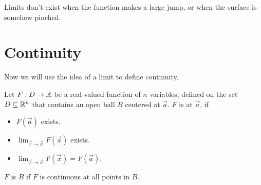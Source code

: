 \documentclass{ximera}
\begin{document}
 Limits don't exist when the function makes a large jump, or when the surface is somehow pinched.



\section{Continuity}

Now we will use the idea of a limit to define continuity.

\begin{definition}
  Let $F:D\to \mathbb R$ be a real-valued function of $n$ variables, defined on the set $D\subseteq\mathbb R^n$ that contains an open ball $B$ centered at
  $\vec{a}$. $F$ is  at $\vec{a}$, if
  \begin{itemize}
  \item $F(\vec{a})$ exists.
  \item $\lim_{\vec{x}\to\vec{a}} F(\vec{x})$ exists.
  \item $\lim_{\vec{x}\to\vec{a}} F(\vec{x}) = F(\vec{a}).$
  \end{itemize}
  $F$ is  $B$ if $F$ is continuous at
  all points in $B$.
\end{definition}
\end{document}
